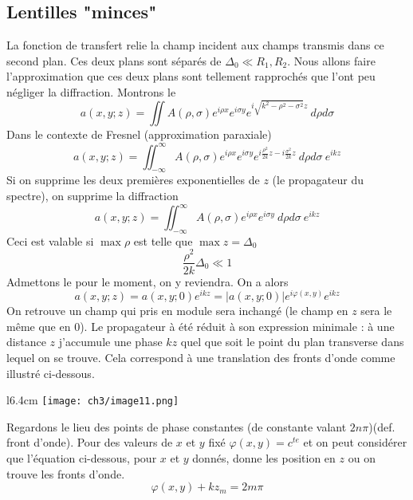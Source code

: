 	\subsection{Lentilles "minces"}
	La fonction de transfert relie la champ incident aux champs transmis dans ce second plan. Ces deux 
	plans sont séparés de $\Delta_0 \ll R_1,R_2$. Nous allons faire l'approximation que ces deux plans 
	sont tellement rapprochés que l'ont peu négliger la diffraction. Montrons le 
	\begin{equation}
	a(x,y;z) = \iint A(\rho,\sigma) e^{i\rho x}e^{i\sigma y} e^{i\sqrt{k^2-\rho^2-\sigma^2}z}\ d\rho d\sigma
	\end{equation}
	Dans le contexte de Fresnel (approximation paraxiale)
	\begin{equation}
	a(x,y;z) = \iint_{-\infty}^\infty A(\rho,\sigma)e^{i\rho x}e^{i\sigma y} e^{i\frac{\rho^2}{2k}z
	-i\frac{\sigma^2}{2k}z}\ d\rho d\sigma\ e^{ikz}
	\end{equation}
	Si on supprime les deux premières exponentielles de $z$ (le propagateur du spectre), on supprime 
	la diffraction
	\begin{equation}
	a(x,y;z) = \iint_{-\infty}^\infty A(\rho,\sigma)e^{i\rho x}e^{i\sigma y}\ d\rho d\sigma\ e^{ikz}
	\end{equation}
	Ceci est valable si $\max\rho$ est telle que $\max z = \Delta_0$
	\begin{equation}
	\frac{\rho^2}{2k}\Delta_0 \ll 1
	\end{equation}
	Admettons le pour le moment, on y reviendra. On a alors
	\begin{equation}
	a(x,y;z) = a(x,y;0)e^{ikz} = |a(x,y;0)|e^{i\varphi(x,y)}e^{ikz}
	\label{eq:amod}
	\end{equation}
	On retrouve un champ qui pris en module sera inchangé (le champ en $z$ sera le même que en 0). Le 
	propagateur à été réduit à son expression minimale : à une distance $z$ j'accumule une phase $kz$ quel 
	que soit le point du plan transverse dans lequel on se trouve. Cela correspond à une translation des 
	fronts d'onde comme illustré ci-dessous.
	
	\newpage

	\begin{wrapfigure}[8]{l}{6.4cm}
	\vspace{-3mm}
	\texttt{[image: ch3/image11.png]}
	\end{wrapfigure}		
	Regardons le lieu des points de phase constantes (de constante valant $2n\pi$)(def. front d'onde).
	Pour des valeurs de $x$ et $y$ fixé $\varphi(x,y) = c^{te}$ et on peut considérer que 
	l'équation ci-dessous, pour $x$ et $y$ donnés, donne les position en $z$ ou on trouve les 
	fronts d'onde.
	\begin{equation}
	\varphi(x,y) + kz_m = 2m\pi
	\end{equation}

